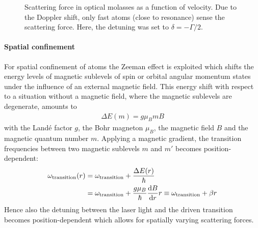 \begin{figure}
    \caption{Scattering force in optical molasses as a function of velocity. Due to the Doppler shift, only fast atoms (close to resonance) sense the scattering force. Here, the detuning was set to $\delta = -\Gamma/2$.
    }
    \label{fig:optical_molasses_force}
\end{figure}

\paragraph{Spatial confinement} For spatial confinement of atoms the Zeeman effect is exploited which shifts the energy levels of magnetic sublevels of spin or orbital angular momentum states under the influence of an external magnetic field. This energy shift with respect to a situation without a magnetic field, where the magnetic sublevels are degenerate, amounts to
\begin{align}
    \Delta E(m) = g \mu_B m B
\end{align}
with the Landé factor $g$, the Bohr magneton $\mu_B$, the magnetic field $B$ and the magnetic quantum number $m$. Applying a magnetic gradient, the transition frequencies between two magnetic sublevels $m$ and $m'$ becomes position-dependent:
\begin{equation}
    \begin{split}\label{eq:omega_transition_zeeman}
      \omega_\text{transition}(r) &= \omega_\text{transition} + \frac{\Delta E(r)}{\hbar} \\  
      &= \omega_\text{transition} + \frac{g \mu_B}{\hbar} \dv{B}{r} r \equiv \omega_\text{transition} + \beta r
    \end{split}
\end{equation}
Hence also the detuning between the laser light and the driven transition becomes position-dependent which allows for spatially varying scattering forces.

